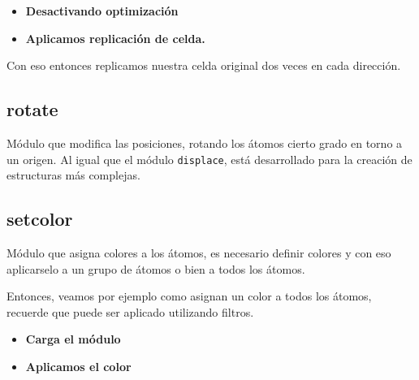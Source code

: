 \begin{itemize}
 \item \textbf{Desactivando optimizaci\'on}
 \item \textbf{Aplicamos replicaci\'on de celda.}
\end{itemize}

Con eso entonces replicamos nuestra celda original dos veces en cada direcci\'on.


\subsection{rotate}
M\'odulo que modifica las posiciones, rotando los \'atomos cierto grado en torno
a un origen. Al igual que el m\'odulo \verb|displace|, est\'a desarrollado para
la creaci\'on de estructuras m\'as complejas.


\subsection{setcolor}
M\'odulo que asigna colores a los \'atomos, es necesario definir colores y con
eso aplicarselo a un grupo de \'atomos o bien a todos los \'atomos. 


Entonces, veamos por ejemplo como asignan un color a todos los \'atomos,
recuerde que puede ser aplicado utilizando filtros.

\begin{itemize}
 \item \textbf{Carga el m\'odulo}
 \item \textbf{Aplicamos el color}
\end{itemize}

